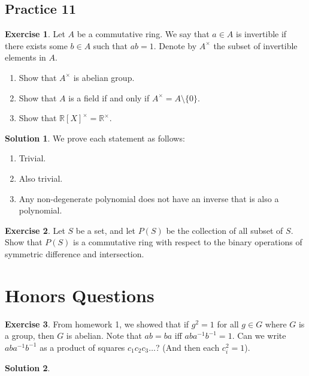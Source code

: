 \documentclass[12pt]{article}
\theoremstyle{definition}
\newcommand{\R}{\mathbb{R}}
\newtheorem{exercise}{\color{YellowOrange}Exercise}
\theoremstyle{definition}
\newtheorem{solution}{\color{Goldenrod}Solution}
\begin{document}
\subsection{Practice 11}
\begin{exercise}
	Let $A$ be a commutative ring. We say that $a \in A$ is invertible if there exists some $b \in A$ such that $ab = 1$. Denote by $A^{\times}$ the subset of invertible elements in $A$. 
	\begin{enumerate}
		\item Show that $A^{\times}$ is abelian group.
		\item Show that $A$ is a field if and only if $A^{\times} = A \setminus \{0\}$.
		\item Show that $\R[X]^{\times} = \R^{\times}$.
	\end{enumerate}
\end{exercise}
\begin{solution}
We prove each statement as follows:
\begin{enumerate}
	\item Trivial.
	\item Also trivial.
	\item Any non-degenerate polynomial does not have an inverse that is also a polynomial.
\end{enumerate}
\end{solution}

\begin{exercise}
	Let $S$ be a set, and let $P(S)$ be the collection of all subset of $S$. Show that $P(S)$ is a commutative ring with respect to the binary operations of symmetric difference and intersection. 
\end{exercise}

\section{Honors Questions}
\begin{exercise}
From homework 1, we showed that if $g^2 = 1$ for all $g \in G$ where $G$ is a group, then $G$ is abelian. Note that $ab = ba$ iff $aba^{-1}b^{-1} = 1$. Can we write $aba^{-1}b^{-1}$ as a product of squares $c_1 c_2 c_3 \ldots $? (And then each $c^2_i = 1$).
\end{exercise}
\begin{solution}

\end{solution}
\end{document}
